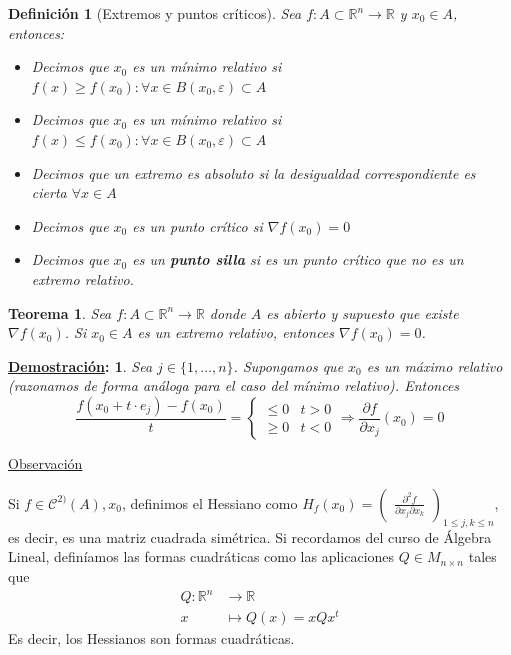 \documentclass[10pt,a4paper,openright]{book}
\theoremstyle{break}
\newtheorem*{defi}{Definición}
\newtheorem*{theo}{Teorema}
\newtheorem*{demo}{\underline{Demostración}:}
\begin{document}
\begin{defi}[Extremos y puntos críticos]
Sea $f: A \subset \mathbb{R}^n \to  \mathbb{R}$ y $x_0 \in A$, entonces:
\begin{itemize}
\item Decimos que $x_0$ es un mínimo relativo si $f(x) \geq f(x_0) : \forall x \in B(x_0, \varepsilon) \subset A$
\item Decimos que $x_0$ es un mínimo relativo si $f(x) \leq f(x_0) : \forall x \in B(x_0, \varepsilon) \subset A$
\item Decimos que un extremo es absoluto si la desigualdad correspondiente es cierta $\forall x \in A$
\item Decimos que $x_0$ es un punto crítico si $\nabla f(x_0) = 0$
\item Decimos que $x_0$ es un \textbf{punto silla} si es un punto crítico que no es un extremo relativo.
\end{itemize}
\end{defi}

\begin{theo}
Sea $f: A \subset \mathbb{R}^n \to \mathbb{R}$ donde $A$ es abierto y supuesto que existe $\nabla f(x_0)$. Si $x_0 \in A$ es un extremo relativo, entonces $\nabla f (x_0) = 0$.
\end{theo}

\begin{demo}
Sea $j \in \{1, \ldots, n\}$. Supongamos que $x_0$ es un máximo relativo (razonamos de forma análoga para el caso del mínimo relativo). Entonces
$$\frac{f(x_0 + t \cdot e_j) - f(x_0)}{t} = \begin{cases} \leq 0 & t> 0 \\ \geq 0 & t < 0 \end{cases}\Rightarrow \frac{\partial f}{\partial x_j} (x_0) = 0$$
\end{demo}

\underline{Observación}

Si $f \in \mathcal{C}^{2)}(A), x_0$, definimos el Hessiano como $ H_f (x_0) = \begin{pmatrix}
\frac{\partial^2 f}{\partial x_j \partial x_k}
\end{pmatrix}_{1 \leq j,k \leq n}$, es decir, es una matriz cuadrada simétrica. Si recordamos del curso de Álgebra Lineal, definíamos las formas cuadráticas como las aplicaciones $Q \in M_{n \times n}$ tales que
\begin{align*}
Q: \mathbb{R}^n &\to \mathbb{R} \\ x &\mapsto Q(x) = x Q x^t
\end{align*}
Es decir, los Hessianos son formas cuadráticas.
\end{document}
